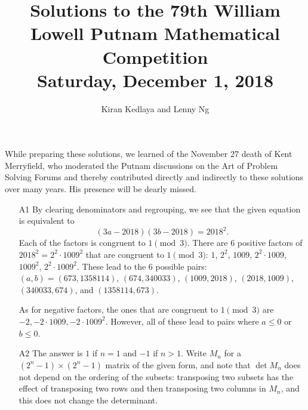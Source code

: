 \documentclass[amssymb,twocolumn,pra,10pt,aps]{revtex4-1}
\begin{document}
\title{Solutions to the 79th William Lowell Putnam Mathematical Competition \\
    Saturday, December 1, 2018}
\author{Kiran Kedlaya and Lenny Ng}
\noaffiliation
\maketitle

While preparing these solutions, we learned of the November 27 death of Kent Merryfield, who moderated the Putnam discussions on the Art of Problem Solving Forums and thereby contributed directly and indirectly to these solutions over many years.
His presence will be dearly missed.

\begin{itemize}
\item[A1]
By clearing denominators and regrouping, we see that the given equation is equivalent to 
\[
(3a-2018)(3b-2018) = 2018^2.
\]
Each of the factors is congruent to $1 \pmod 3$. There are $6$ positive factors of $2018^2 = 2^2 \cdot 1009^2$ that are congruent to $1 \pmod 3$: $1$, $2^2$, $1009$, $2^2 \cdot 1009$, $1009^2$, $2^2 \cdot 1009^2$. These lead to the $6$ possible pairs: $(a,b) = (673,1358114)$, $(674,340033)$, $(1009,2018)$, $(2018,1009)$, $(340033,674)$, and $(1358114,673)$.

As for negative factors, the ones that are congruent to $1 \pmod 3$ are $-2, -2 \cdot 1009, -2 \cdot 1009^2$.
However, all of these lead to pairs where $a \leq 0$ or $b \leq 0$.

\item[A2]
The answer is $1$ if $n=1$ and $-1$ if $n>1$. Write $M_n$ for a $(2^n-1) \times (2^n-1)$ matrix of the given form, and note that $\det M_n$ does not depend on the ordering of the subsets: transposing two subsets has the effect of transposing two rows and then transposing two columns in $M_n$, and this does not change the determinant.


\end{itemize}
\end{document}
